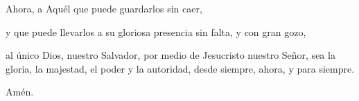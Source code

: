  Ahora, a Aquél que puede guardarlos sin caer,

y que puede llevarlos a su gloriosa presencia sin falta, y con gran
gozo,

 al único Dios, nuestro Salvador, por medio de Jesucristo
nuestro Señor, sea la gloria, la majestad, el poder y la autoridad,
desde siempre, ahora, y para siempre.

Amén.
